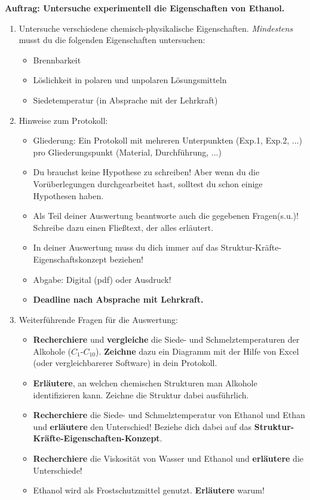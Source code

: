 \documentclass{scrartcl}  %
\begin{document}
				\noindent \textbf{Auftrag: Untersuche experimentell die Eigenschaften von Ethanol.}
				\begin{enumerate}
					\item Untersuche verschiedene chemisch-physikalische Eigenschaften. \textit{Mindestens} musst du die folgenden Eigenschaften untersuchen:
						\begin{itemize}
							\item Brennbarkeit
							\item Löslichkeit in polaren und unpolaren Lösungsmitteln
							\item Siedetemperatur (in Absprache mit der Lehrkraft)
						\end{itemize}
					\item Hinweise zum Protokoll:
						\begin{itemize}
							\item Gliederung: Ein Protokoll mit mehreren Unterpunkten (Exp.1, Exp.2, ...) pro Gliederungspunkt (Material, Durchführung, ...)
							\item Du brauchst keine Hypothese zu schreiben! Aber wenn du die Vorüberlegungen durchgearbeitet hast, solltest du schon einige Hypothesen haben.
							\item  Als Teil deiner Auswertung beantworte auch die gegebenen Fragen(s.u.)! Schreibe dazu einen Fließtext, der alles erläutert.
							\item In deiner Auswertung muss du dich immer auf das Struktur-Kräfte-Eigenschaftskonzept beziehen!
							\item Abgabe: Digital (pdf) oder Ausdruck!
							\item \textbf{Deadline nach Absprache mit Lehrkraft.}
						\end{itemize}
					\item Weiterführende Fragen für die Auswertung:
						\begin{itemize}
							\item \textbf{Recherchiere} und \textbf{vergleiche} die Siede- und Schmelztemperaturen der Alkohole ($ C_{1} $-$ C_{10} $). \textbf{Zeichne} dazu ein Diagramm mit der Hilfe von Excel (oder vergleichbarerer Software) in dein Protokoll.
							\item \textbf{Erläutere}, an welchen chemischen Strukturen man Alkohole identifizieren kann. Zeichne die Struktur dabei ausführlich.
							\item \textbf{Recherchiere} die Siede- und Schmelztemperatur von Ethanol und Ethan und \textbf{erläutere} den Unterschied! Beziehe dich dabei auf das \textbf{Struktur-Kräfte-Eigenschaften-Konzept}.
							\item \textbf{Recherchiere} die Viskosität von Wasser und Ethanol und \textbf{erläutere} die Unterschiede!
							\item Ethanol wird als Frostschutzmittel genutzt. \textbf{Erläutere} warum!
						\end{itemize}
				\end{enumerate}
\end{document}
